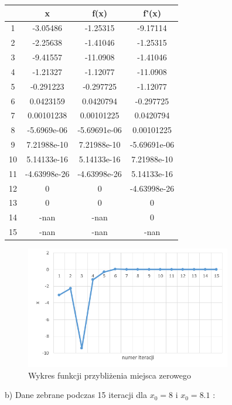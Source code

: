 \documentclass{article}
\begin{document}
\begin{table}[h!]
    \centering
    \begin{tabular}{|c|c||c||c|} \hline
     & x & f(x) & f'(x) \\ \hline
1 & -3.05486 & -1.25315 & -9.17114\\ \hline
2 & -2.25638 & -1.41046 & -1.25315\\ \hline
3 & -9.41557 & -11.0908 & -1.41046\\ \hline
4 & -1.21327 & -1.12077 & -11.0908\\ \hline
5 & -0.291223 & -0.297725 & -1.12077\\ \hline
6 & 0.0423159 & 0.0420794 & -0.297725\\ \hline
7 & 0.00101238 & 0.00101225 & 0.0420794\\ \hline
8 & -5.6969e-06 & -5.69691e-06 & 0.00101225\\ \hline
9 & 7.21988e-10 & 7.21988e-10 & -5.69691e-06\\ \hline
10 & 5.14133e-16 & 5.14133e-16 & 7.21988e-10\\ \hline
11 & -4.63998e-26 & -4.63998e-26 & 5.14133e-16\\ \hline
12 & 0 & 0 & -4.63998e-26\\ \hline
13 & 0 & 0 & 0\\ \hline
14 & -nan & -nan & 0\\ \hline
15 & -nan & -nan & -nan\\ \hline
    \end{tabular}

    \label{tab:my_label}
\end{table}

\begin{figure}[h!]
\centering
\includegraphics[width=9cm]{su.png}
\caption{ Wykres funkcji przybliżenia miejsca zerowego}
\label{fig:obrazek su}
\end{figure}
\newpage

b) Dane zebrane podczas 15 iteracji dla $x_0=8$ i $x_0=8.1$ :
\end{document}
